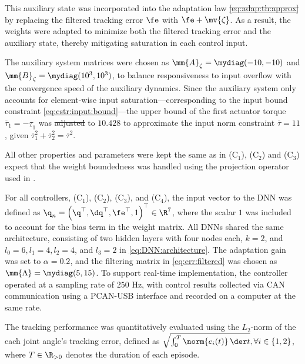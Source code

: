 \documentclass[letterpaper, journal]{IEEEtran}
\providecommand{\DIFadd}[1]{{\protect\color{blue}\uwave{#1}}} %
\providecommand{\DIFdel}[1]{{\protect\color{red}\sout{#1}}} %
\providecommand{\DIFaddbegin}{} %
\providecommand{\DIFaddend}{} %
\providecommand{\DIFdelbegin}{} %
\providecommand{\DIFdelend}{} %
\begin{document}
This auxiliary state was incorporated into the adaptation law \DIFdelbegin \DIFdel{\eqref{eq:adap:th:approx} }\DIFdelend by replacing the filtered tracking error $\fe$ with $\fe+\mv{\zeta}$.
As a result, the weights were adapted to minimize both the filtered tracking error and the auxiliary state, thereby mitigating saturation in each control input.

The auxiliary system matrices were chosen as $\mm{A}_\zeta=\mydiag(-10,-10)$ and $\mm{B}_\zeta=\mydiag(10^3,10^3)$, 
to balance responsiveness to input overflow with the convergence speed of the auxiliary dynamics.
Since the auxiliary system only accounts for element-wise input saturation—corresponding to the input bound constraint \eqref{eq:cstr:input:bound}—the upper bound of the first actuator torque $\overline{\tau}_1=-\underline{\tau}_1$ was \DIFdelbegin \DIFdel{adjusted }\DIFdelend \DIFaddbegin \DIFadd{set }\DIFaddend to $10.428$ to approximate the input norm constraint $\overline{\tau} = 11$, given $\overline{\tau}_1^2 + \overline{\tau}_2^2 = \overline{\tau}^2$.

All other properties and parameters were kept the same as in (C$_1$), (C$_2$) and (C$_3$) expect that the weight boundedness was handled using the projection operator used in \cite{Patil:2022aa}.

\hfill

For all controllers, \ie (C$_1$), (C$_2$), (C$_3$), and (C$_4$), the input vector to the DNN was defined as ${\q}_n=\left(\q^\top,\dq^\top,\fe^\top,1\right)^\top\in\R^{7}$, where the scalar $1$ was included to account for the bias term in the weight matrix.
All DNNs shared the same architecture, consisting of two hidden layers with four nodes each, \ie $k=2$, and $l_0=6, l_1=4, l_2=4$, and $l_3=2$ in \eqref{eq:DNN:architecture}.
The adaptation gain was set to $\alpha = 0.2$, and the filtering matrix in \eqref{eq:err:filtered} was chosen as $\mm{\Lambda}=\mydiag(5,15)$.
To support real-time implementation, the controller operated at a sampling rate of $250$ Hz, with control results collected via CAN communication using a PCAN-USB interface and recorded on a computer at the same rate.

The tracking performance was quantitatively evaluated using the $L_2$-norm of the each joint angle's tracking error, defined as \DIFdelbegin \DIFdel{$\sqrt{\int_0^T\norm{e_i(t)}\,\der t},\forall i\in\{1,2\}$}\DIFdelend \DIFaddbegin \DIFadd{$\sqrt{\int_0^T\norm{e_i(t)}\,\der t},\ \forall i\in\{1,2\}$}\DIFaddend , where $T\in\R_{>0}$ denotes the duration of each episode.
\end{document}
